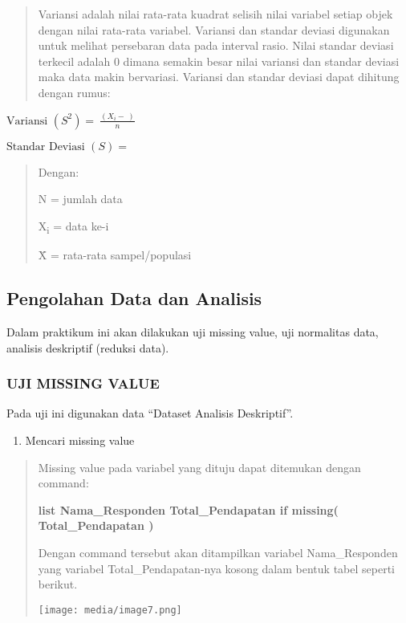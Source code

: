\documentclass[
]{article}
\begin{document}
\begin{quote}
Variansi adalah nilai rata-rata kuadrat selisih nilai variabel setiap
objek dengan nilai rata-rata variabel. Variansi dan standar deviasi
digunakan untuk melihat persebaran data pada interval rasio. Nilai
standar deviasi terkecil adalah 0 dimana semakin besar nilai variansi
dan standar deviasi maka data makin bervariasi. Variansi dan standar
deviasi dapat dihitung dengan rumus:
\end{quote}

\(\text{Variansi\ }\left( S^{2} \right) = \ \frac{(X_{i} - \ )}{n}\)

\(\text{Standar\ Deviasi\ }(S) = \ \)

\begin{quote}
Dengan:

N = jumlah data

X\textsubscript{i} = data ke-i

X̄ = rata-rata sampel/populasi
\end{quote}

\hypertarget{pengolahan-data-dan-analisis}{%
\subsection{Pengolahan Data dan
Analisis}\label{pengolahan-data-dan-analisis}}

Dalam praktikum ini akan dilakukan uji missing value, uji normalitas
data, analisis deskriptif (reduksi data).

\hypertarget{uji-missing-value}{%
\subsubsection{UJI MISSING VALUE}\label{uji-missing-value}}

Pada uji ini digunakan data ``Dataset Analisis Deskriptif''.

\begin{enumerate}
\def\labelenumi{\arabic{enumi}.}
\item
  Mencari missing value
\end{enumerate}

\begin{quote}
Missing value pada variabel yang dituju dapat ditemukan dengan command:

\textbf{list Nama\_Responden Total\_Pendapatan if missing(
Total\_Pendapatan )}

Dengan command tersebut akan ditampilkan variabel Nama\_Responden yang
variabel Total\_Pendapatan-nya kosong dalam bentuk tabel seperti
berikut.

\texttt{[image: media/image7.png]}
\end{quote}
\end{document}
